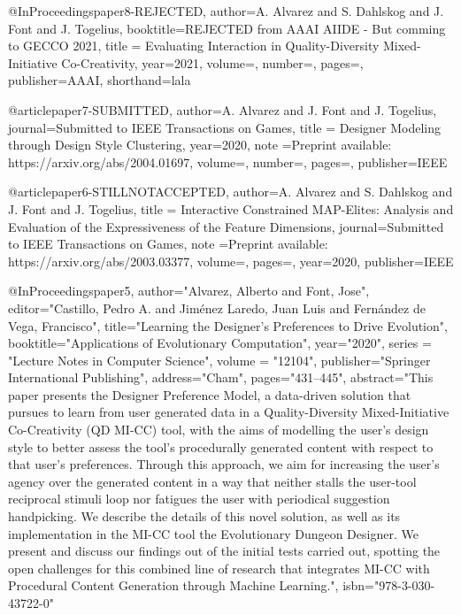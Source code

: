 



@InProceedings{paper8-REJECTED,
author={A. {Alvarez} and S. {Dahlskog} and J. {Font} and J. {Togelius}},
 booktitle={REJECTED from AAAI AIIDE - But comming to GECCO 2021},
title     = {Evaluating Interaction in Quality-Diversity Mixed-Initiative Co-Creativity},
year={2021},
volume={},
number={},
pages={},
publisher={AAAI},
shorthand={lala}
}

@article{paper7-SUBMITTED,
author={A. {Alvarez} and J. {Font} and J. {Togelius}},
 journal={Submitted to IEEE Transactions on Games},
title     = {Designer Modeling through Design Style Clustering},
year={2020},
note ={Preprint available: https://arxiv.org/abs/2004.01697},
volume={},
number={},
pages={},
publisher={IEEE}
}

@article{paper6-STILLNOTACCEPTED,
author={A. {Alvarez} and S. {Dahlskog} and J. {Font} and J. {Togelius}},
  title     = {Interactive Constrained MAP-Elites: Analysis and Evaluation of the Expressiveness of the Feature Dimensions},
  journal={Submitted to IEEE Transactions on Games},
  note ={Preprint available: https://arxiv.org/abs/2003.03377},
  volume={},
  pages={},
  year={2020},
  publisher={IEEE}
}

@InProceedings{paper5,
author="Alvarez, Alberto
and Font, Jose",
editor="Castillo, Pedro A.
and Jim{\'e}nez Laredo, Juan Luis
and Fern{\'a}ndez de Vega, Francisco",
title="Learning the Designer's Preferences to Drive Evolution",
booktitle="Applications of Evolutionary Computation",
year="2020",
series = "Lecture Notes in Computer Science",
volume = "12104",
publisher="Springer International Publishing",
address="Cham",
pages="431--445",
abstract="This paper presents the Designer Preference Model, a data-driven solution that pursues to learn from user generated data in a Quality-Diversity Mixed-Initiative Co-Creativity (QD MI-CC) tool, with the aims of modelling the user's design style to better assess the tool's procedurally generated content with respect to that user's preferences. Through this approach, we aim for increasing the user's agency over the generated content in a way that neither stalls the user-tool reciprocal stimuli loop nor fatigues the user with periodical suggestion handpicking. We describe the details of this novel solution, as well as its implementation in the MI-CC tool the Evolutionary Dungeon Designer. We present and discuss our findings out of the initial tests carried out, spotting the open challenges for this combined line of research that integrates MI-CC with Procedural Content Generation through Machine Learning.",
isbn="978-3-030-43722-0"
}



